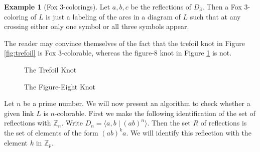 \documentclass{article}
\theoremstyle{definition}
\newtheorem{example}[theorem]{Example}
\begin{document}
\begin{example}[Fox $3$-colorings]
Let $a, b, c$ be the reflections of $D_3$. Then a Fox $3$-coloring of $L$ is just a labeling of the arcs in a diagram of $L$ such that at any crossing either only one symbol or all three symbols appear.

The reader may convince themselves of the fact that the trefoil knot in Figure \ref{fig:trefoil} is Fox $3$-colorable, whereas the figure-8 knot in Figure \ref{fig:figure-8} is not.

\begin{figure}[ht]
\centering
\begin{minipage}{0.5\textwidth}
 \centering
{}
\caption{The Trefoil Knot}
\label{fig:trefoil}
\end{minipage}%
\begin{minipage}{0.5\textwidth}
\centering
{}
\caption{The Figure-Eight Knot}
\label{fig:figure-8}
\end{minipage}
\end{figure}
\end{example}

Let $n$ be a prime number. We will now present an algorithm to check whether a given link $L$ is $n$-colorable. First we make the following identification of the set of reflections with $\mathbb{Z}_n$. Write $D_n = \langle a, b \; | \; (ab)^n \rangle$. Then the set $R$ of reflections is the set of elements of the form $(ab)^ka$. We will identify this reflection with the element $k$ in $\mathbb{Z}_p$.
\end{document}
